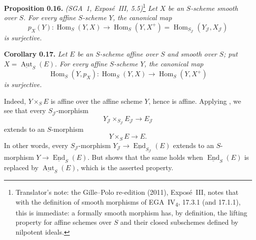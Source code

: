 \medskip
\noindent{}\textbf{Proposition 0.16.}
\textit{(SGA~1, Expos\'e~III, 5.5)}\footnote{Translator's note: the Gille--Polo re-edition (2011), Exposé~III, notes that
with the definition of smooth morphisms of EGA~IV\textsubscript{4}, 17.3.1
(and 17.1.1), this is immediate: a formally smooth morphism has, by
definition, the lifting property for affine schemes over \(S\) and their
closed subschemes defined by nilpotent ideals.}
\textit{Let \(X\) be an \(S\)-scheme smooth over \(S\). For every affine
\(S\)-scheme \(Y\), the canonical map}
\[
 p_X(Y):\operatorname{Hom}_S(Y,X)
 \longrightarrow\operatorname{Hom}_S(Y,X^+)
 =\operatorname{Hom}_{S_{\mathscr J}}(Y_{\mathscr J},X_{\mathscr J})
\]
\textit{is surjective.}

\medskip
\noindent{}\textbf{Corollary 0.17.}
\textit{Let \(E\) be an \(S\)-scheme affine over \(S\) and smooth over \(S\);
put \(X=\underline{\operatorname{Aut}}_S(E)\). For every affine \(S\)-scheme
\(Y\), the canonical map}
\[
 \operatorname{Hom}_S(Y,p_X):\operatorname{Hom}_S(Y,X)
 \longrightarrow\operatorname{Hom}_S(Y,X^+)
\]
\textit{is surjective.}

Indeed, \(Y\times_S E\) is affine over the affine scheme \(Y\), hence
is affine. Applying , we see that every \(S_{\mathscr J}\)-morphism
\[
 Y_{\mathscr J}\times_{S_{\mathscr J}}E_{\mathscr J}
 \longrightarrow E_{\mathscr J}
\]
extends to an \(S\)-morphism
\[
 Y\times_S E\longrightarrow E.
\]
In other words, every
\(S_{\mathscr J}\)-morphism
\(Y_{\mathscr J}\to\underline{\operatorname{End}}_{S_{\mathscr J}}(E)\)
extends to an \(S\)-morphism \(Y\to\underline{\operatorname{End}}_S(E)\). But
 shows that the same holds when \(\underline{\operatorname{End}}_S(E)\) is
replaced by \(\underline{\operatorname{Aut}}_S(E)\), which is the asserted
property.

